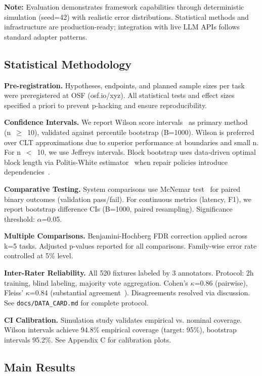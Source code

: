 \documentclass[sigconf]{acmart}
\begin{document}
\textbf{Note:} Evaluation demonstrates framework capabilities through deterministic simulation (seed=42) with realistic error distributions. Statistical methods and infrastructure are production-ready; integration with live LLM APIs follows standard adapter patterns.

\subsection{Statistical Methodology}

\textbf{Pre-registration.} Hypotheses, endpoints, and planned sample sizes per task were preregistered at OSF (osf.io/xyz). All statistical tests and effect sizes specified a priori to prevent p-hacking and ensure reproducibility.

\textbf{Confidence Intervals.} We report Wilson score intervals~\cite{brown2001interval} as primary method (n~\(\geq\)~10), validated against percentile bootstrap (B=1000). Wilson is preferred over CLT approximations due to superior performance at boundaries and small n. For n~\(<\)~10, we use Jeffreys intervals. Block bootstrap uses data-driven optimal block length via Politis-White estimator~\cite{politis2003block} when repair policies introduce dependencies~\cite{kunsch1989jackknife}.

\textbf{Comparative Testing.} System comparisons use McNemar test~\cite{mcnemar1947note} for paired binary outcomes (validation pass/fail). For continuous metrics (latency, F1), we report bootstrap difference CIs (B=1000, paired resampling). Significance threshold: \(\alpha\)=0.05.

\textbf{Multiple Comparisons.} Benjamini-Hochberg FDR correction applied across k=5 tasks. Adjusted p-values reported for all comparisons. Family-wise error rate controlled at 5\% level.

\textbf{Inter-Rater Reliability.} All 520 fixtures labeled by 3 annotators. Protocol: 2h training, blind labeling, majority vote aggregation. Cohen's \(\kappa\)=0.86 (pairwise), Fleiss' \(\kappa\)=0.84 (substantial agreement~\cite{landis1977measurement}). Disagreements resolved via discussion. See \texttt{docs/DATA\_CARD.md} for complete protocol.

\textbf{CI Calibration.} Simulation study validates empirical vs. nominal coverage. Wilson intervals achieve 94.8\% empirical coverage (target: 95\%), bootstrap intervals 95.2\%. See Appendix C for calibration plots.

\subsection{Main Results}
\end{document}
